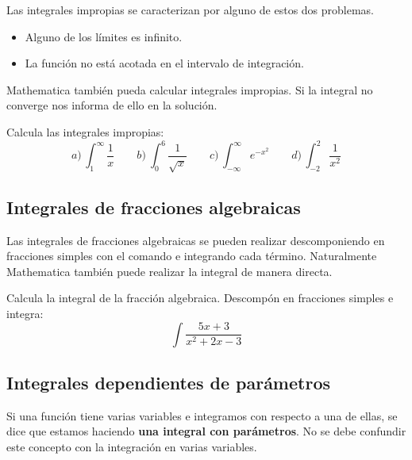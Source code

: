 \documentclass[a4paper,10pt, draft]{article}
\newcommand{\com}[1]{\textbf{\color{blue}{#1}}}
\newenvironment{ejer}{\begin{tcolorbox}[center title, title=Ejercicios,
fonttitle=\sffamily\bfseries,colback=blue!5,colframe=orange]}{\end{tcolorbox}}
\begin{document}
Las integrales impropias se caracterizan por alguno de estos dos \guillemotleft problemas\guillemotright.

\begin{itemize}

\item Alguno de los límites es infinito.

\item La función no está acotada en el intervalo de integración.


\end{itemize}


Mathematica también pueda calcular integrales impropias.  Si la integral no converge nos informa de ello en la solución. 

\begin{ejer}

Calcula las integrales impropias:
$$
 a)\,\int_1^\infty \frac{1}{x}\qquad b)\ \int_0^6\frac{1}{\sqrt{x}} \qquad c)\, \int_{-\infty}^\infty e^{-x^2} \qquad d)\, \int _{-2}^2 \frac{1}{x^2}
 $$
 
 \end{ejer}  \newpage
 
 \subsection{Integrales de fracciones algebraicas}

Las integrales de fracciones algebraicas se pueden realizar descomponiendo en fracciones simples  con el comando \com{Apart[frac]} e integrando cada término.
Naturalmente  Mathematica también puede realizar la integral de manera directa.

\begin{ejer}

Calcula la integral de la fracción algebraica. Descompón en fracciones simples e integra:
$$
\int \frac{5x+3}{x^2+2x-3}
$$

\end{ejer}  \newpage

\subsection{Integrales dependientes de parámetros}

Si una función tiene varias variables e integramos con respecto a una de ellas, se dice que estamos haciendo \textbf{una integral con parámetros}. No se debe confundir este concepto con la integración en varias variables.  
\end{document}
